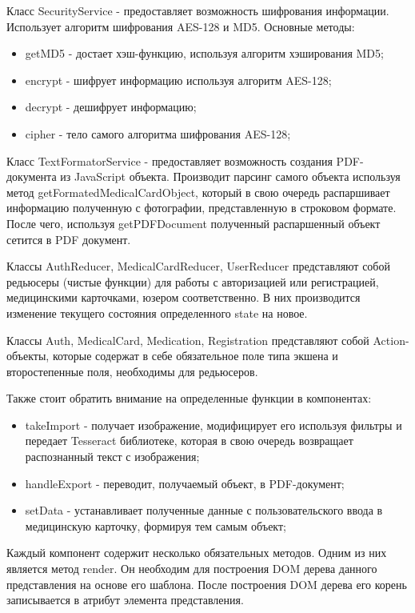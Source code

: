 Класс SecurityService - предоставляет возможность шифрования информации. Использует алгоритм шифрования AES-128 и MD5. Основные методы:
\begin{itemize}
  \item getMD5 - достает хэш-функцию, используя алгоритм хэширования MD5;
  \item encrypt - шифрует информацию используя алгоритм AES-128;
  \item decrypt - дешифрует информацию;
  \item cipher - тело самого алгоритма шифрования AES-128;
\end{itemize}

Класс TextFormatorService - предоставляет возможность создания PDF-документа из JavaScript объекта. Производит парсинг самого объекта используя метод getFormatedMedicalCardObject, который в свою очередь распаршивает информацию полученную с фотографии, представленную в строковом формате. После чего, используя getPDFDocument полученный распаршенный объект сетится в PDF документ.

Классы AuthReducer, MedicalCardReducer, UserReducer представляют собой редьюсеры (чистые функции) для работы с авторизацией или регистрацией, медицинскими карточками, юзером соответственно. В них производится изменение текущего состояния определенного state на новое.

Классы Auth, MedicalCard, Medication, Registration представляют собой Action-объекты, которые содержат в себе обязательное поле типа экшена и второстепенные поля, необходимы для редьюсеров.

Также стоит обратить внимание на определенные функции в компонентах:
\begin{itemize}
  \item takeImport - получает изображение, модифицирует его используя фильтры и передает Tesseract библиотеке, которая в свою очередь возвращает распознанный текст с изображения;
  \item handleExport - переводит, получаемый объект, в PDF-документ;
  \item setData - устанавливает полученные данные с пользовательского ввода в медицинскую карточку, формируя тем самым объект;
\end{itemize}

Каждый компонент содержит несколько обязательных методов. Одним из них является метод render. Он необходим для построения DOM дерева данного представления на основе его шаблона. После построения DOM дерева его корень записывается в атрибут элемента представления.

